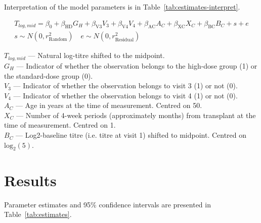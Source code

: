 \documentclass[11pt]{article}
\begin{document}
Interpretation of the model parameters is in
Table~\ref{tab:estimates-interpret}.

\begin{equation}
    \begin{gathered}
        \label{eq:model}
        T_{log,mid} = \beta_0 + \beta_{\text{HD}}G_H + \beta_{\text{V3}}V_3
        + \beta_{\text{V4}}V_4 + \beta_{\text{AC}}A_C
        + \beta_{\text{XC}}X_C + \beta_{\text{BC}}B_C
        + s + e\\
        s \sim N(0, r^2_{\text{Random}}) \quad e \sim N(0, r^2_{\text{Residual}})
    \end{gathered}
\end{equation}

$T_{log,mid}$ --- Natural log-titre shifted to the midpoint.\\
$G_H$ --- Indicator of whether the observation belongs to the
high-dose group (1) or the standard-dose group (0).\\
$V_3$ --- Indicator of whether the observation belongs to
visit 3 (1) or not (0).\\
$V_4$ --- Indicator of whether the observation belongs to
visit 4 (1) or not (0).\\
$A_C$ --- Age in years at the time of measurement. Centred on 50.\\
$X_C$ --- Number of 4-week periods (approximately months)
from transplant at the time of measurement. Centred on 1.\\
$B_C$ --- Log2-baseline titre (i.e. titre at visit 1) shifted to midpoint.
Centred on $\text{log}_2(5)$.

\section{Results}

Parameter estimates and 95\% confidence intervals
are presented in Table~\ref{tab:estimates}.




\end{document}
